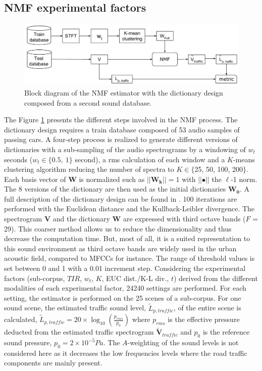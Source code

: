 \documentclass[12pt,english,twoside]{article}
\begin{document}
\subsection{NMF experimental factors}

\begin{figure}
    \centering
    \includegraphics[width=.7\linewidth]{./figures/bloc_diagram_complet_NMF_EN.pdf}
    \caption{Block diagram of the NMF estimator with the dictionary design composed from a second sound database.}
    \label{fig:bloc_nmf}
\end{figure}

The Figure \ref{fig:bloc_nmf} presents the different steps involved in the NMF process. 
The dictionary design requires a train database composed of 53 audio samples of passing cars. A four-step process is realized to generate different versions of dictionaries with a sub-sampling of the audio spectrograms by a windowing of $w_t$ seconds ($w_t\in \lbrace 0.5,~1\rbrace$ second), a rms calculation of each window and a $K$-means clustering algorithm reducing the number of spectra to $K \in \lbrace$25, 50, 100, 200$\rbrace$. Each basis vector of $\mathbf{W}$ is normalized such as $\vert \vert \mathbf{W_k} \vert \vert = 1$ with $\vert \vert \bullet \vert\vert$ the $\ell$-1 norm. The 8 versions of the dictionary are then used as the initial dictionaries $\mathbf{W_0}$. A full description of the dictionary design can be found in \cite{gloaguen2019road}.
100 iterations are performed with the Euclidean distance and the Kullback-Leibler divergence. The spectrogram $\mathbf{V}$ and the dictionary $\mathbf{W}$ are expressed with third octave bands ($F$ = 29). This coarser method allows us to reduce the dimensionality and thus decrease the computation time. But, most of all, it is a suited representation to this sound environment as third octave bands are widely used in the urban acoustic field, compared to MFCCs for instance. The range of threshold values is set between 0 and 1 with a 0.01 increment step. Considering the experimental factors (sub-corpus, $TIR$, $w_t$, $K$, EUC dist./K-L div., $t$) derived from the different modalities of each experimental factor, 24240 settings are performed. For each setting, the estimator is performed on the 25 scenes of a sub-corpus. For one sound scene, the estimated traffic sound level, $\tilde{L}_{p,traffic}$, of the entire scene is calculated, $\tilde{L}_{p,traffic} = 20 \times \log_{10}\left(\frac{p_{rms}}{p_0}\right)$ where $p_{rms}$ is the effective pressure deducted from the estimated traffic spectrogram $\mathbf{\tilde{V}}_{traffic}$ and $p_0$ is the reference sound pressure, $p_0 = 2 \times 10^{-5} Pa$.  The $A$-weighting of the sound levels is not considered here as it decreases the low frequencies levels where the road traffic components are mainly present. 
\end{document}
